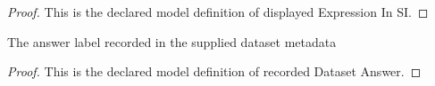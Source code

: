 \begin{proof}
  This is the declared model definition of displayed Expression In SI.
\end{proof}
\begin{definition}
  \label{def:physics:phyx-mini-0949:phyxminiproblems-problemphyxmini0949-recordeddatasetanswer}
  The answer label recorded in the supplied dataset metadata
\end{definition}
\begin{proof}
  This is the declared model definition of recorded Dataset Answer.
\end{proof}
